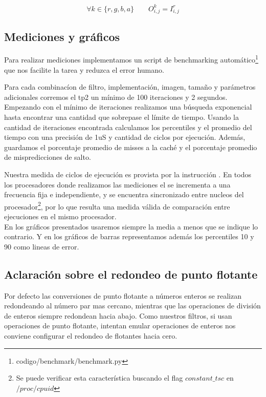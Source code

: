 $$\forall k \in \{r,g,b,a\} \qquad O^k_{i,j} = I^r_{i,j}$$

\subsection{Mediciones y gráficos}

Para realizar mediciones implementamos un script de benchmarking automático\footnote{codigo/benchmark/benchmark.py} que nos facilite la tarea y reduzca el error humano.

Para cada combinacíon de filtro, implementación, imagen, tamaño y parámetros adicionales corremos el tp2 un mínimo de 100 iteraciones y 2 segundos. Empezando con el mínimo de iteraciones realizamos una búsqueda exponencial hasta encontrar una cantidad que sobrepase el límite de tiempo. Usando la cantidad de iteraciones encontrada calculamos los percentiles y el promedio del tiempo con una precisión de 1uS y cantidad de ciclos por ejecución. Además, guardamos el porcentaje promedio de misses a la caché y el porcentaje promedio de mispredicciones de salto.

Nuestra medida de ciclos de ejecución es provista por la instrucción . En todos los procesadores donde realizamos las mediciones el  se incrementa a una frecuencia fija e independiente, y se encuentra sincronizado entre nucleos del procesador\footnote{Se puede verificar esta característica buscando el flag $constant\_tsc$ en $/proc/cpuid$}\textsuperscript{\cite[Volume 3B, Chapter 17.15]{intelsys}}, por lo que resulta una medida válida de comparación entre ejecuciones en el mismo procesador.
\\

En los gráficos presentados usaremos siempre la media a menos que se indique lo contrario. Y en los gráficos de barras representamos además los percentiles 10 y 90 como lineas de error.
\\

\subsection{Aclaración sobre el redondeo de punto flotante}

Por defecto las conversiones de punto flotante a números enteros se realizan redondeando al número par mas cercano\textsuperscript{\cite[Volume 1, Chapter 10.2.3]{intelsys}}, mientras que las operaciones de división de enteros siempre redondean hacia abajo.
Como nuestros filtros, si usan operaciones de punto flotante, intentan emular operaciones de enteros nos conviene configurar el redondeo de flotantes hacia cero.

